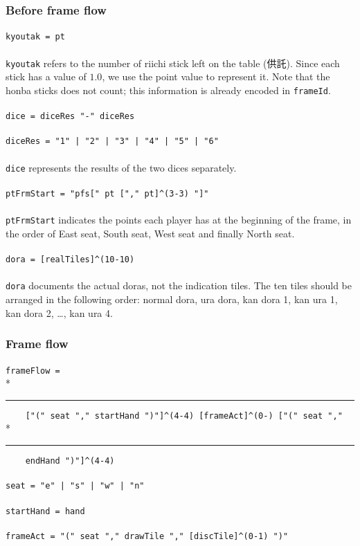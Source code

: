 \documentclass[%
	a4paper%
	,10pt%
	,twoside%
	,notitlepage%
]{article}%
\newcommand*{\ruleSymbol}{\textjapanese{⚠}}%
\newcommand*{\ruleMargin}{\marginpar{\flushright{}\ruleSymbol{}}}%
\newcommand*{\rulePar}{\paragraph*{\ruleMargin{}}}%
\newcommand*{\indentRule}{\rule{10pt}{0pt}}%
\begin{document}
		\subsubsection{Before frame flow}\label{subsubsec:prefrmflow}%
			\rulePar{}\lstinline/kyoutak = pt/%
			\paragraph*{}\lstinline/kyoutak/ refers to the number of riichi stick left on the table (\textjapanese{供託}). Since each stick has a value of $1.0$, we use the point value to represent it. Note that the honba sticks does not count; this information is already encoded in \lstinline/frameId/. %
			\rulePar{}\lstinline/dice = diceRes "-" diceRes/%
			\rulePar{}\lstinline/diceRes = "1" | "2" | "3" | "4" | "5" | "6"/%
			\paragraph*{}\lstinline/dice/ represents the results of the two dices separately. %
			\rulePar{}\lstinline/ptFrmStart = "pfs[" pt ["," pt]^(3-3) "]"/%
			\paragraph*{}\lstinline/ptFrmStart/ indicates the points each player has at the beginning of the frame, in the order of East seat, South seat, West seat and finally North seat. %
			\rulePar{}\lstinline/dora = [realTiles]^(10-10)/%
			\paragraph*{}\lstinline/dora/ documents the actual doras, not the indication tiles. The ten tiles should be arranged in the following order: normal dora, ura dora, kan dora 1, kan ura 1, kan dora 2, \dots{}, kan ura 4. %
		\subsubsection{Frame flow}\label{subsubsec:frmflow}%
			\rulePar{}\lstinline/frameFlow = /\\*{}%
			\indentRule{}\lstinline/    ["(" seat "," startHand ")"]^(4-4) [frameAct]^(0-) ["(" seat "," /\\*{}%
			\indentRule{}\lstinline/    endHand ")"]^(4-4)/%
			\rulePar{}\lstinline/seat = "e" | "s" | "w" | "n"/%
			\rulePar{}\lstinline/startHand = hand/%
			\rulePar{}\lstinline/frameAct = "(" seat "," drawTile "," [discTile]^(0-1) ")"/%
\end{document}
